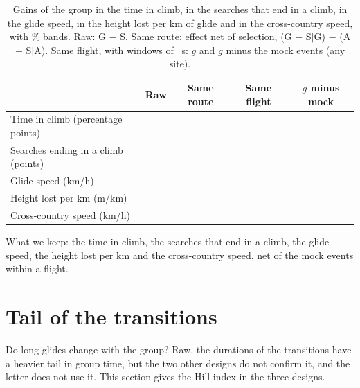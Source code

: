 \documentclass[aps,prl,twocolumn,superscriptaddress,nofootinbib]{revtex4-2}
\newcommand{\vb}[2]{#1~#2}
\begin{document}
\begin{table}[t]
\caption{Gains of the group in the time in climb, in the searches that end in a climb, in the glide
speed, in the height lost per km of glide and in the cross-country speed, with \LtBandLevel\% bands.
Raw: G $-$ S. Same route: effect net of selection, (G $-$ S$|$G) $-$ (A $-$ S$|$A). Same flight, with
windows of \LtWinMid~s: $g$ and $g$ minus the mock events (any site).}
\label{tab:speed}
\small
\begin{ruledtabular}
\begin{tabular}{lcccc}
 & Raw & Same route & Same flight & $g$ minus mock \\
\hline
Time in climb (percentage points) & \vb{\RawGapClimb}{\RawGapClimbBand} & \vb{\MatDeltaClimbD}{\MatDeltaClimbDBand} & \vb{\PreGClimb}{\PreGClimbBand} & \vb{\PreNetGClimb}{\PreNetGClimbBand} \\
Searches ending in a climb (points) & \vb{\RawGapFound}{\RawGapFoundBand} & \vb{\MatDeltaFoundD}{\MatDeltaFoundDBand} & \vb{\PreGFound}{\PreGFoundBand} & \vb{\PreNetGFound}{\PreNetGFoundBand} \\
Glide speed (km/h) & \vb{\RawGapGlide}{\RawGapGlideBand} & \vb{\MatDeltaGlideD}{\MatDeltaGlideDBand} & \vb{\PreGGlide}{\PreGGlideBand} & \vb{\PreNetGGlide}{\PreNetGGlideBand} \\
Height lost per km (m/km) & \vb{\RawGapSink}{\RawGapSinkBand} & \vb{\MatDeltaSinkD}{\MatDeltaSinkDBand} & \vb{\PreGSink}{\PreGSinkBand} & \vb{\PreNetGSink}{\PreNetGSinkBand} \\
Cross-country speed (km/h) & \vb{\RawGapXc}{\RawGapXcBand} & \vb{\MatDeltaXcD}{\MatDeltaXcDBand} & \vb{\PreGXc}{\PreGXcBand} & \vb{\PreNetGXc}{\PreNetGXcBand} \\
\end{tabular}
\end{ruledtabular}
\end{table}

What we keep: the time in climb, the searches that end in a climb, the glide speed, the height lost per
km and the cross-country speed, net of the mock events within a flight.

\section{Tail of the transitions}\label{sm:tails}

Do long glides change with the group? Raw, the durations of the transitions have a heavier tail in
group time, but the two other designs do not confirm it, and the letter does not use it. This
section gives the Hill index in the three designs.
\end{document}
